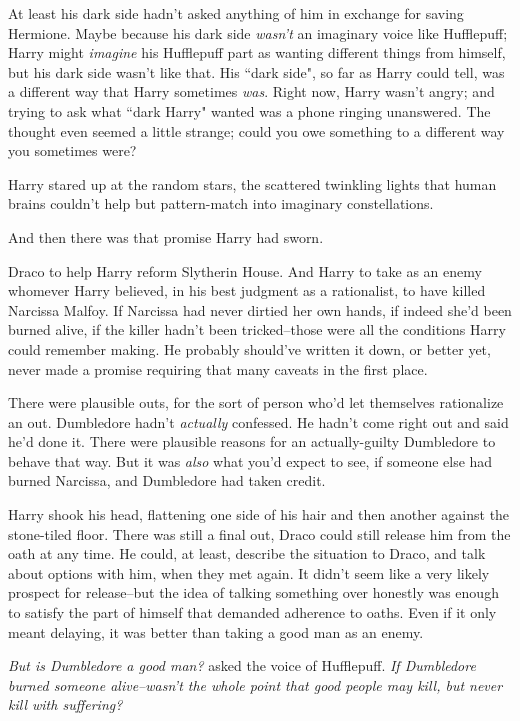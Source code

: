 At least his dark side hadn't asked anything of him in exchange for saving Hermione. Maybe because his dark side \emph{wasn't} an imaginary voice like Hufflepuff; Harry might \emph{imagine} his Hufflepuff part as wanting different things from himself, but his dark side wasn't like that. His ``dark side", so far as Harry could tell, was a different way that Harry sometimes \emph{was}. Right now, Harry wasn't angry; and trying to ask what ``dark Harry" wanted was a phone ringing unanswered. The thought even seemed a little strange; could you owe something to a different way you sometimes were?

Harry stared up at the random stars, the scattered twinkling lights that human brains couldn't help but pattern-match into imaginary constellations.

And then there was that promise Harry had sworn.

Draco to help Harry reform Slytherin House. And Harry to take as an enemy whomever Harry believed, in his best judgment as a rationalist, to have killed Narcissa Malfoy. If Narcissa had never dirtied her own hands, if indeed she'd been burned alive, if the killer hadn't been tricked\---those were all the conditions Harry could remember making. He probably should've written it down, or better yet, never made a promise requiring that many caveats in the first place.

There were plausible outs, for the sort of person who'd let themselves rationalize an out. Dumbledore hadn't \emph{actually} confessed. He hadn't come right out and said he'd done it. There were plausible reasons for an actually-guilty Dumbledore to behave that way. But it was \emph{also} what you'd expect to see, if someone else had burned Narcissa, and Dumbledore had taken credit.

Harry shook his head, flattening one side of his hair and then another against the stone-tiled floor. There was still a final out, Draco could still release him from the oath at any time. He could, at least, describe the situation to Draco, and talk about options with him, when they met again. It didn't seem like a very likely prospect for release\---but the idea of talking something over honestly was enough to satisfy the part of himself that demanded adherence to oaths. Even if it only meant delaying, it was better than taking a good man as an enemy.

\emph{But \emph{is} Dumbledore a good man?} asked the voice of Hufflepuff. \emph{If Dumbledore burned someone alive\---wasn't the whole point that good people may kill, but never kill with suffering?}


